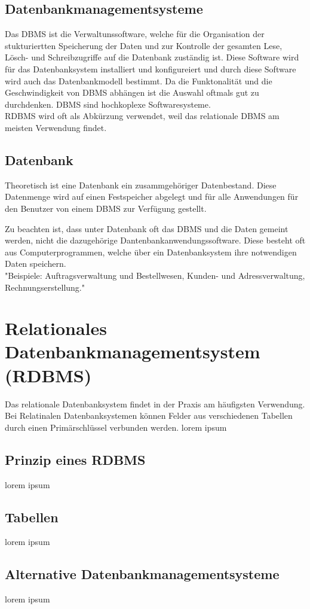 \documentclass[11pt,a4paper]{report}
\begin{document}
\subsection{Datenbankmanagementsysteme}
Das DBMS ist die Verwaltunssoftware, welche für die Organisation der stukturiertten  Speicherung der Daten und zur Kontrolle der gesamten Lese, Lösch- und Schreibzugriffe auf die Datenbank zuständig ist.
Diese Software wird für das Datenbanksystem installiert und konfigureiert und durch diese Software wird auch das Datenbankmodell bestimmt.
Da die Funktonalität und die Geschwindigkeit von DBMS abhängen ist die Auswahl oftmals gut zu durchdenken.
DBMS sind hochkoplexe Softwaresysteme.\\

RDBMS wird oft als Abkürzung verwendet, weil das relationale DBMS am meisten Verwendung findet.

\subsection{Datenbank}
Theoretisch ist eine Datenbank ein zusammgehöriger Datenbestand. 
Diese Datenmenge wird auf einen Festspeicher abgelegt und für alle Anwendungen für den Benutzer von einem DBMS zur Verfügung gestellt.

Zu beachten ist, dass unter Datenbank oft das DBMS und die Daten gemeint werden, nicht die dazugehörige Dantenbankanwendungssoftware. Diese besteht oft aus Computerprogrammen, welche über ein Datenbanksystem ihre notwendigen Daten speichern.
\\"Beispiele: Auftragsverwaltung und Bestellwesen, Kunden- und Adressverwaltung, Rechnungserstellung."

\section{Relationales Datenbankmanagementsystem (RDBMS)}
Das relationale Datenbanksystem findet in der Praxis am häufigsten Verwendung.
Bei Relatinalen Datenbanksystemen können Felder aus verschiedenen Tabellen durch einen Primärschlüssel verbunden werden.
lorem ipsum
\subsection{Prinzip eines RDBMS}
lorem ipsum
\subsection{Tabellen}
lorem ipsum
\subsection{Alternative Datenbankmanagementsysteme}
lorem ipsum
\end{document}
